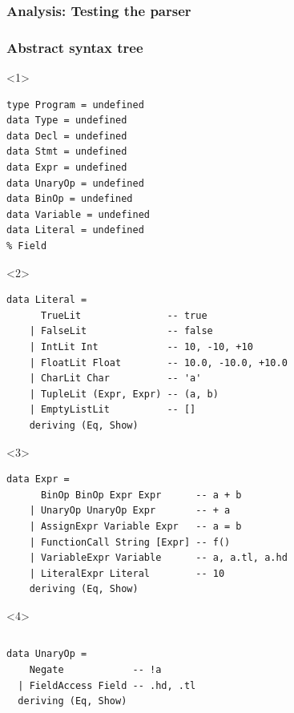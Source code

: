\documentclass{beamer}
\begin{document}
\begin{frame}
  \frametitle{Analysis: Testing the parser}

\end{frame}


\begin{frame}[fragile]
  \frametitle{Abstract syntax tree}
  \begin{onlyenv}<1>
    \begin{verbatim}
type Program = undefined
data Type = undefined
data Decl = undefined
data Stmt = undefined
data Expr = undefined
data UnaryOp = undefined
data BinOp = undefined
data Variable = undefined
data Literal = undefined
% Field
    \end{verbatim}
  \end{onlyenv}

\begin{onlyenv}<2>
 \begin{verbatim} 
data Literal =
      TrueLit               -- true
    | FalseLit              -- false
    | IntLit Int            -- 10, -10, +10
    | FloatLit Float        -- 10.0, -10.0, +10.0
    | CharLit Char          -- 'a'
    | TupleLit (Expr, Expr) -- (a, b)
    | EmptyListLit          -- []
    deriving (Eq, Show)
 \end{verbatim}
\end{onlyenv}

\begin{onlyenv}<3>
 \begin{verbatim}
data Expr =
      BinOp BinOp Expr Expr      -- a + b
    | UnaryOp UnaryOp Expr       -- + a
    | AssignExpr Variable Expr   -- a = b
    | FunctionCall String [Expr] -- f()
    | VariableExpr Variable      -- a, a.tl, a.hd
    | LiteralExpr Literal        -- 10
    deriving (Eq, Show) 
  \end{verbatim}
\end{onlyenv}


\begin{onlyenv}<4>

 \begin{columns}
    \begin{verbatim}
data UnaryOp = 
    Negate            -- !a
  | FieldAccess Field -- .hd, .tl
  deriving (Eq, Show)
    \end{verbatim}


\end{columns}
\end{onlyenv}
\end{frame}
\end{document}
